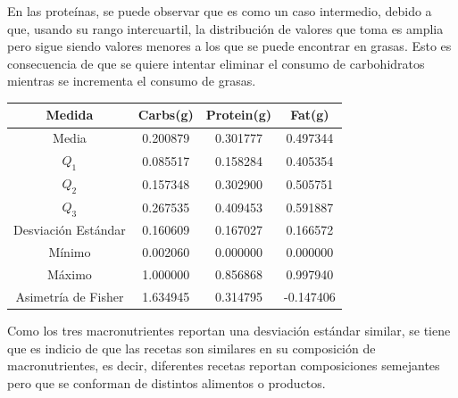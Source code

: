 \documentclass[12pt,a4paper]{article}
\begin{document}
        En las proteínas, se puede observar que es como un caso intermedio, 
        debido a que, usando su rango intercuartil, la distribución de valores 
        que toma es amplia pero sigue siendo valores menores a los que se puede 
        encontrar en grasas. Esto es consecuencia de que se quiere intentar 
        eliminar el consumo de carbohidratos mientras se incrementa el consumo 
        de grasas.
        \begin{center}
            \begin{tabular}{|c|ccc|}
                \hline
                Medida & Carbs(g) & Protein(g) & Fat(g) \\
                \hline
                Media               & 0.200879 & 0.301777 & 0.497344  \\
                $Q_1$               & 0.085517 & 0.158284 & 0.405354  \\
                $Q_2$               & 0.157348 & 0.302900 & 0.505751  \\
                $Q_3$               & 0.267535 & 0.409453 & 0.591887  \\
                Desviación Estándar & 0.160609 & 0.167027 & 0.166572  \\
                Mínimo              & 0.002060 & 0.000000 & 0.000000  \\
                Máximo              & 1.000000 & 0.856868 & 0.997940  \\
                Asimetría de Fisher & 1.634945 & 0.314795 & -0.147406 \\
                \hline
            \end{tabular}
        \end{center}
        Como los tres macronutrientes reportan una desviación estándar similar, 
        se tiene que es indicio de que las recetas son similares en su composición 
        de macronutrientes, es decir, diferentes recetas reportan composiciones 
        semejantes pero que se conforman de distintos alimentos o productos.\\
\end{document}
